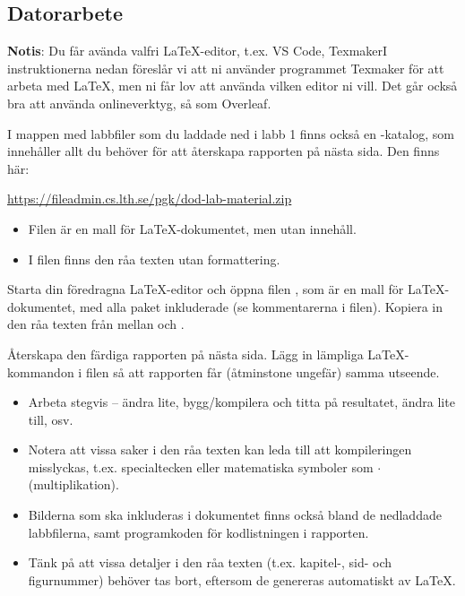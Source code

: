 \newpage

\subsection*{Datorarbete}

\textbf{Notis}: Du får avända valfri \LaTeX-editor, t.ex. VS Code, TexmakerI instruktionerna nedan föreslår vi att ni använder programmet Texmaker för att arbeta med \LaTeX, men ni får lov att använda vilken editor ni vill. Det går också bra att använda onlineverktyg, så som Overleaf.

\begin{Datorarbete}
	\item I mappen med labbfiler som du laddade ned i labb 1 finns också en -katalog, som innehåller allt du behöver för att återskapa rapporten på nästa sida. Den finns här:
	
	\url{https://fileadmin.cs.lth.se/pgk/dod-lab-material.zip}
	
	\begin{itemize}
		\item Filen  är en mall för \LaTeX-dokumentet, men utan innehåll.
		\item I filen  finns den råa texten utan formattering.
	\end{itemize}
	\item Starta din föredragna \LaTeX-editor och öppna filen , som är en mall för \LaTeX-dokumentet, med alla paket inkluderade (se kommentarerna i filen). Kopiera in den råa texten från  mellan \verb// och \verb//.
	\item Återskapa den färdiga rapporten på nästa sida. Lägg in lämpliga \LaTeX-kommandon i filen så att rapporten får (åtminstone ungefär) samma utseende.
	\begin{itemize}
		\item Arbeta stegvis -- ändra lite, bygg/kompilera och titta på resultatet, ändra lite till, osv.
		\item Notera att vissa saker i den råa texten kan leda till att kompileringen misslyckas, t.ex. specialtecken eller matematiska symboler som \(\cdot\) (multiplikation).
		\item Bilderna som ska inkluderas i dokumentet finns också bland de nedladdade labbfilerna, samt programkoden för kodlistningen i rapporten.
		\item Tänk på att vissa detaljer i den råa texten (t.ex. kapitel-, sid- och figurnummer) behöver tas bort, eftersom de genereras automatiskt av \LaTeX.
	\end{itemize}


\end{Datorarbete}
